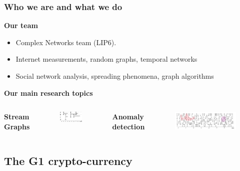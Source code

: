 \documentclass{beamer}
\begin{document}
\begin{frame}
	\frametitle{Who we are and what we do}
	\textbf{Our team}
	\begin{itemize}
		\item Complex Networks team (LIP6).
		\item Internet measurements, random graphs, temporal networks
		\item Social network analysis, spreading phenomena, graph algorithms
	\end{itemize}
	\bigskip
	\textbf{Our main research topics}
	\bigskip
	\begin{columns}[t]
		\textbf{Stream Graphs}
		\begin{figure}
			\includegraphics[width=0.8\linewidth]{./figures/stream_graph}
		\end{figure}
		\textbf{Anomaly detection}
		\begin{figure}
			\includegraphics[width=\linewidth]{./figures/anomalie_detection}
		\end{figure}
	\end{columns}
\end{frame}


\subsection{The G1 crypto-currency}
\end{document}
